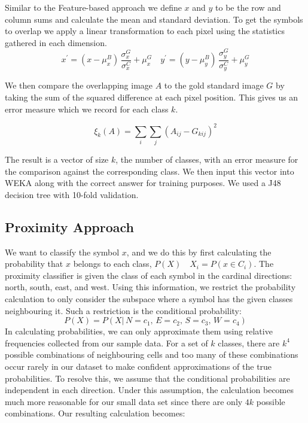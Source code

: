 \documentclass[preprint,3p,12pt]{elsarticle}
\begin{document}
Similar to the Feature-based approach we define $x$ and $y$ to be the row and column sums and calculate the mean and standard deviation.
To get the symbols to overlap we apply a linear transformation to each pixel using the statistics gathered in each dimension.
\begin{equation} \label{eq:gold}
x^{\prime} = (x - \mu^{B}_{x}) \, \frac{\sigma^{G}_{x}}{\sigma^{C}_{x}} + \mu^{G}_{x} \quad
y^{\prime} = (y - \mu^{B}_{y}) \, \frac{\sigma^{G}_{y}}{\sigma^{C}_{y}} + \mu^{G}_{y}
\end{equation}

We then compare the overlapping image $A$ to the gold standard image $G$ by taking the sum of the squared difference at each pixel position.
This gives us an error measure which we record for each class $k$.

\[
\xi_{k}(A) = \sum_{i}\sum_{j}{(A_{ij} - G_{kij})^{2}}
\]

The result is a vector of size $k$, the number of classes, with an error measure for the comparison
against the corresponding class. We then input this vector into WEKA along with the correct answer
for training purposes. We used a J48 decision tree with 10-fold validation.

\subsection{Proximity Approach}
\label{process:proximity}

We want to classify the symbol $x$, and we do this by first calculating the
probability that $x$ belongs to each class, $P(X)\quad X_i = P(x\!\in\! C_i)$.
The proximity classifier is given the class of each symbol in the
cardinal directions: north, south, east, and west. Using this information,
we restrict the probability calculation to only consider the subspace
where a symbol has the given classes neighbouring it. Such a restriction is
the conditional probability:
\[
P(X) = P(X|\,N\!=\!c_1,\,E\!=\!c_2,\,S\!=\!c_3,\,W\!=\!c_4)
\]
In calculating probabilities, we can only approximate them using relative
frequencies collected from our sample data. For a set of $k$ classes, there are $k^4$ possible combinations of neighbouring
cells and too many of these combinations occur rarely in our dataset to make
confident approximations of the true probabilities. To resolve this, we assume that
the conditional probabilities are independent in each direction. Under this
assumption, the calculation becomes much more reasonable for our small data set
since there are only $4k$ possible combinations. Our resulting calculation becomes:
\end{document}

